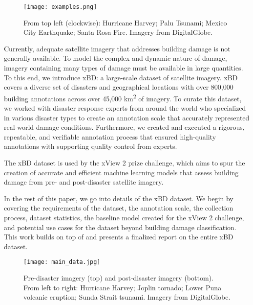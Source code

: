 \documentclass[10pt,twocolumn,letterpaper]{article}
\begin{document}
\begin{figure}[ht]
	\begin{center}
		\texttt{[image: examples.png]}
	\end{center}
	\caption{From top left (clockwise): Hurricane Harvey; Palu Tsunami; Mexico City Earthquake; Santa Rosa Fire. Imagery from DigitalGlobe.}
	\vspace{-0.5cm}
	\label{fig:teaser}
\end{figure}
Currently,  adequate satellite imagery that addresses building damage is  not generally available.
To model the complex and dynamic nature of damage, imagery containing many types of damage must be available in large quantities.
To this end, we introduce xBD: a large-scale dataset of satellite imagery.  xBD covers a diverse set of disasters and geographical locations with over 800,000 building annotations across over 45,000 km\textsuperscript{2} of imagery.
To curate this dataset, we worked with disaster response experts from around the world who specialized in various disaster types to create an annotation scale that accurately represented real-world damage conditions.
Furthermore, we created and executed a rigorous, repeatable, and verifiable annotation process that ensured high-quality annotations with supporting quality control from experts.

The xBD dataset is used by the xView 2 prize challenge, which aims to spur the creation of accurate and efficient machine learning models that assess building damage from pre- and post-disaster satellite imagery.

In the rest of this paper, we go into details of the xBD dataset.
We begin by covering the requirements of the dataset, the annotation scale, the collection process, dataset statistics, the baseline model created for the xView 2 challenge, and potential use cases for the dataset beyond building damage classification.
This work builds on top of \cite{guptaCreatingXBDDataset2019} and presents a finalized report on the entire xBD dataset.

\begin{figure*}[!h]
	\begin{center}
		\texttt{[image: main\_data.jpg]}
	\end{center}
	\caption{Pre-disaster imagery (top)  and post-disaster imagery (bottom). From left to right: Hurricane Harvey; Joplin tornado; Lower Puna volcanic eruption; Sunda Strait tsunami. Imagery from DigitalGlobe.}
	\label{fig:teaser}
\end{figure*}
\end{document}

